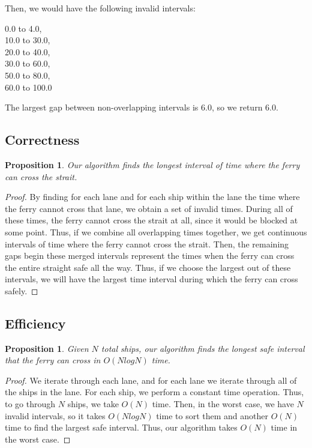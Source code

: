 \documentclass[12pt]{article}
\newtheorem{proposition}[theorem]{Proposition}
\begin{document}
Then, we would have the following invalid intervals:

\begin{center}
    0.0 to 4.0, \\
    10.0 to 30.0, \\
    20.0 to 40.0, \\
    30.0 to 60.0, \\
    50.0 to 80.0, \\
    60.0 to 100.0
\end{center}

\noindent The largest gap between non-overlapping intervals
is 6.0, so we return 6.0.

\subsection{Correctness}

\begin{proposition}
    Our algorithm finds the longest interval of time where
    the ferry can cross the strait.
\end{proposition}

\begin{proof}
    By finding for each lane and for each ship within the lane
    the time where the ferry cannot cross that lane, we obtain
    a set of invalid times. During all of these times, the ferry
    cannot cross the strait at all, since it would be blocked at
    some point. Thus, if we combine all overlapping times together,
    we get continuous intervals of time where the ferry cannot cross
    the strait. Then, the remaining gaps begin these merged intervals
    represent the times when the ferry can cross the entire straight
    safe all the way. Thus, if we choose the largest out of these
    intervals, we will have the largest time interval during which
    the ferry can cross safely.
\end{proof}

\subsection{Efficiency}

\begin{proposition}
    Given $N$ total ships, our algorithm finds the longest safe interval
    that the ferry can cross in $O(NlogN)$ time.
\end{proposition}

\begin{proof}
    We iterate through each lane, and for each lane we iterate through
    all of the ships in the lane. For each ship, we perform a constant
    time operation. Thus, to go through $N$ ships, we take $O(N)$ time.
    Then, in the worst case, we have $N$ invalid intervals, so it takes
    $O(NlogN)$ time to sort them and another $O(N)$ time to find the
    largest safe interval. Thus, our algorithm takes $O(N)$ time in
    the worst case.
\end{proof}
\end{document}
